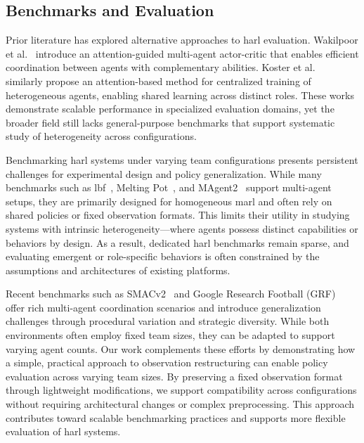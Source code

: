 \subsection{Benchmarks and Evaluation}

Prior literature has explored alternative approaches to \gls{harl} evaluation. 
Wakilpoor et al.~\cite{wakilpoor2020} introduce an attention-guided multi-agent actor-critic 
that enables efficient coordination between agents with complementary abilities. 
Koster et al.~\cite{koster2020} similarly propose an attention-based method for centralized 
training of heterogeneous agents, enabling shared learning across distinct roles. 
These works demonstrate scalable performance in specialized evaluation domains, 
yet the broader field still lacks general-purpose benchmarks that support systematic 
study of heterogeneity across configurations.

Benchmarking \gls{harl} systems under varying team configurations presents persistent
challenges for experimental design and policy generalization. While many benchmarks such 
as \gls{lbf}~\cite{papoudakis2021}, Melting Pot~\cite{leibo2021}, and MAgent2~\cite{zheng2017} 
support multi-agent setups, they are primarily designed for homogeneous \gls{marl} 
and often rely on shared policies or fixed observation formats. This limits 
their utility in studying systems with intrinsic heterogeneity—where agents possess 
distinct capabilities or behaviors by design. As a result, dedicated \gls{harl} benchmarks 
remain sparse, and evaluating emergent or role-specific behaviors is often constrained 
by the assumptions and architectures of existing platforms.

Recent benchmarks such as SMACv2~\cite{ellis2023} and Google Research Football 
(GRF)~\cite{kurach2020} offer rich multi-agent coordination scenarios and introduce 
generalization challenges through procedural variation and strategic diversity. While both 
environments often employ fixed team sizes, they can be adapted to support varying agent counts.
Our work complements these efforts by demonstrating how a simple, practical approach to 
observation restructuring can enable policy evaluation across varying team sizes. By 
preserving a fixed observation format through lightweight modifications, we support compatibility 
across configurations without requiring architectural changes or complex preprocessing.
This approach contributes toward scalable benchmarking practices and supports 
more flexible evaluation of \gls{harl} systems.


